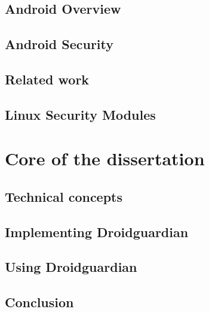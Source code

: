 \documentclass[
  oneside,
  11pt, a4paper,
  footinclude=true,
  headinclude=true,
  cleardoublepage=empty
]{scrbook}
\begin{document}
\chapter{Android Overview}
\label{chap:android_overview}


\chapter{Android Security}
\label{chap:android_security}


\chapter{Related work}
\label{chap:background}


\chapter{Linux Security Modules}
\label{chap:lsm}


\part{Core of the dissertation}

\chapter{Technical concepts}
\label{chap:technical_concepts}


\chapter{Implementing Droidguardian}
\label{chap:implementing_dg}


\chapter{Using Droidguardian}
\label{chap:using_dg}


\chapter{Conclusion}
\label{chap:conclusion}

\end{document}
